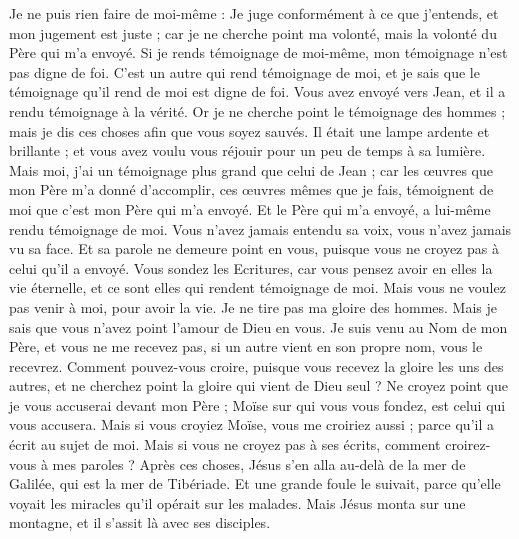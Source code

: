 \begin{multicols}{2}
Je ne puis rien faire de moi-même : Je juge conformément à ce que j'entends, et mon jugement est juste ; car je ne cherche point ma volonté, mais la volonté du Père qui m'a envoyé.
Si je rends témoignage de moi-même, mon témoignage n'est pas digne de foi.
C'est un autre qui rend témoignage de moi, et je sais que le témoignage qu'il rend de moi est digne de foi.
Vous avez envoyé vers Jean, et il a rendu témoignage à la vérité.
Or je ne cherche point le témoignage des hommes ; mais je dis ces choses afin que vous soyez sauvés.
Il était une lampe ardente et brillante ; et vous avez voulu vous réjouir pour un peu de temps à sa lumière.
Mais moi, j'ai un témoignage plus grand que celui de Jean ; car les œuvres que mon Père m'a donné d'accomplir, ces œuvres mêmes que je fais, témoignent de moi que c'est mon Père qui m'a envoyé.
Et le Père qui m'a envoyé, a lui-même rendu témoignage de moi. Vous n'avez jamais entendu sa voix, vous n'avez jamais vu sa face.
Et sa parole ne demeure point en vous, puisque vous ne croyez pas à celui qu'il a envoyé.
Vous sondez les Ecritures, car vous pensez avoir en elles la vie éternelle, et ce sont elles qui rendent témoignage de moi.
Mais vous ne voulez pas venir à moi, pour avoir la vie.
Je ne tire pas ma gloire des hommes.
Mais je sais que vous n'avez point l'amour de Dieu en vous.
Je suis venu au Nom de mon Père, et vous ne me recevez pas, si un autre vient en son propre nom, vous le recevrez.
Comment pouvez-vous croire, puisque vous recevez la gloire les uns des autres, et ne cherchez point la gloire qui vient de Dieu seul ?
Ne croyez point que je vous accuserai devant mon Père ; Moïse sur qui vous vous fondez, est celui qui vous accusera.
Mais si vous croyiez Moïse, vous me croiriez aussi ; parce qu'il a écrit au sujet de moi.
Mais si vous ne croyez pas à ses écrits, comment croirez-vous à mes paroles ?
\VerseOne{}Après ces choses, Jésus s'en alla au-delà de la mer de Galilée, qui est la mer de Tibériade.
Et une grande foule le suivait, parce qu'elle voyait les miracles qu'il opérait sur les malades.
Mais Jésus monta sur une montagne, et il s'assit là avec ses disciples.

\end{multicols}
